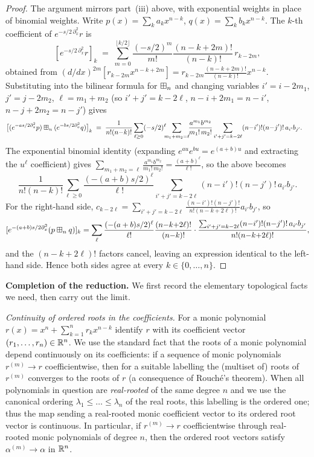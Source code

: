 \begin{proof}
The argument mirrors part~(iii) above, with exponential weights in place of
binomial weights.  Write $p(x)=\sum_k a_kx^{n-k}$, $q(x)=\sum_k b_kx^{n-k}$.
The $k$-th coefficient of $e^{-s/2\,\partial_x^2}r$ is
\[
[e^{-s/2\,\partial_x^2}r]_k
\;=\;\sum_{m=0}^{\lfloor k/2\rfloor}\frac{(-s/2)^m}{m!}
 \frac{(n{-}k{+}2m)!}{(n{-}k)!}\,r_{k-2m},
\]
obtained from $(d/dx)^{2m}[r_{k-2m}x^{n-k+2m}]
=r_{k-2m}\frac{(n-k+2m)!}{(n-k)!}x^{n-k}$.
Substituting into the bilinear formula for $\boxplus_n$ and
changing variables $i'=i-2m_1$, $j'=j-2m_2$, $\ell=m_1+m_2$
(so $i'+j'=k-2\ell$, $n-i+2m_1=n-i'$, $n-j+2m_2=n-j'$) gives
\begin{align*}
\bigl[(e^{-as/2\partial_x^2}p)\boxplus_n(e^{-bs/2\partial_x^2}q)\bigr]_k
&\;=\;\frac{1}{n!(n{-}k)!}\sum_{\ell\ge0}(-s/2)^\ell
 \!\!\!\sum_{m_1+m_2=\ell}\!\!\frac{a^{m_1}b^{m_2}}{m_1!\,m_2!}
 \sum_{i'+j'=k-2\ell}(n{-}i')!(n{-}j')!\,a_{i'}b_{j'}.
\end{align*}
The exponential binomial identity (expanding $e^{au}e^{bu}=e^{(a+b)u}$
and extracting the $u^\ell$ coefficient) gives
$\sum_{m_1+m_2=\ell}\frac{a^{m_1}b^{m_2}}{m_1!\,m_2!}=\frac{(a+b)^\ell}{\ell!}$,
so the above becomes
\[
\frac{1}{n!(n{-}k)!}\sum_{\ell\ge0}\frac{(-(a+b)s/2)^\ell}{\ell!}
\sum_{i'+j'=k-2\ell}(n{-}i')!(n{-}j')!\,a_{i'}b_{j'}.
\]
For the right-hand side, $c_{k-2\ell}=\sum_{i'+j'=k-2\ell}
\frac{(n-i')!(n-j')!}{n!(n-k+2\ell)!}a_{i'}b_{j'}$, so
\[
[e^{-(a+b)s/2\partial_x^2}(p\boxplus_n q)]_k
=\sum_\ell\frac{(-(a+b)s/2)^\ell}{\ell!}\frac{(n{-}k{+}2\ell)!}{(n{-}k)!}
\cdot\frac{\sum_{i'+j'=k-2\ell}(n{-}i')!(n{-}j')!\,a_{i'}b_{j'}}{n!(n{-}k{+}2\ell)!},
\]
and the $(n{-}k{+}2\ell)!$ factors cancel, leaving an expression identical
to the left-hand side.  Hence both sides agree at every
$k\in\{0,\dots,n\}$.
\end{proof}

\noindent\textbf{Completion of the reduction.}
We first record the elementary topological facts we need, then carry out the
limit.

\medskip
\noindent\textit{Continuity of ordered roots in the coefficients.}
For a monic polynomial $r(x)=x^n+\sum_{k=1}^n r_k x^{n-k}$ identify $r$ with its
coefficient vector $(r_1,\dots,r_n)\in\mathbb{R}^n$. We use the standard fact that
the roots of a monic polynomial depend continuously on its coefficients: if a
sequence of monic polynomials $r^{(m)}\to r$ coefficientwise, then for a suitable
labelling the (multiset of) roots of $r^{(m)}$ converges to the roots of $r$
\cite[Ch.~II, App.~A]{Whitney} (a consequence of Rouch\'e's theorem). When all
polynomials in question are \emph{real-rooted} of the same degree $n$ and we use
the canonical ordering $\lambda_1\le\dots\le\lambda_n$ of the real roots, this
labelling is the ordered one; thus the map sending a real-rooted monic
coefficient vector to its ordered root vector is continuous. In particular, if
$r^{(m)}\to r$ coefficientwise through real-rooted monic polynomials of degree
$n$, then the ordered root vectors satisfy $\alpha^{(m)}\to\alpha$ in $\mathbb{R}^n$.

